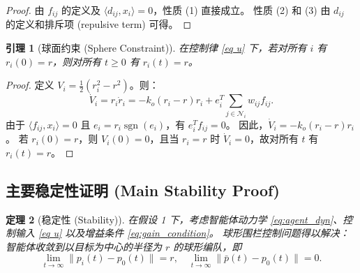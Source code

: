 \documentclass{ctexart}
\DeclareMathOperator{\sgn}{sgn}
\newtheorem{theorem}{定理}[section]
\newtheorem{lemma}[theorem]{引理}
\begin{document}
\begin{proof}
由 $f_{ij}$ 的定义及 $\langle d_{ij}, x_i \rangle = 0$，性质 (1) 直接成立。
性质 (2) 和 (3) 由 $d_{ij}$ 的定义和排斥项 (repulsive term) 可得。
\end{proof}

\begin{lemma}[球面约束 (Sphere Constraint)]
在控制律 \eqref{eq u} 下，若对所有 $i$ 有 $r_i(0) = r$，则对所有 $t \geq 0$ 有 $r_i(t) = r$。
\end{lemma}

\begin{proof}
定义 $V_i = \frac{1}{2}(r_i^2 - r^2)$。则：
\begin{equation}
\dot{V}_i = r_i \dot{r}_i = -k_o(r_i - r)r_i + e_i^T \sum_{j \in \mathcal{N}_i} w_{ij} f_{ij}.
\end{equation}
由于 $\langle f_{ij}, x_i \rangle = 0$ 且 $e_i = r_i \sgn(e_i)$，有 $e_i^T f_{ij} = 0$。
因此，$\dot{V}_i = -k_o(r_i - r)r_i$。
若 $r_i(0) = r$，则 $V_i(0) = 0$，且当 $r_i = r$ 时 $\dot{V}_i = 0$，故对所有 $t$ 有 $r_i(t) = r$。
\end{proof}

\subsection*{主要稳定性证明 (Main Stability Proof)}

\begin{theorem}[稳定性 (Stability)]
在假设 1 下，考虑智能体动力学 \eqref{eq:agent_dyn}、控制输入 \eqref{eq u} 以及增益条件 \eqref{eq:gain_condition}。
球形围栏控制问题得以解决：智能体收敛到以目标为中心的半径为 $r$ 的球形编队，即
\begin{equation*}
\lim_{t \to \infty} \|p_i(t) - p_0(t)\| = r, \quad
\lim_{t \to \infty} \|\bar{p}(t) - p_0(t)\| = 0.
\end{equation*}
\end{theorem}
\end{document}
